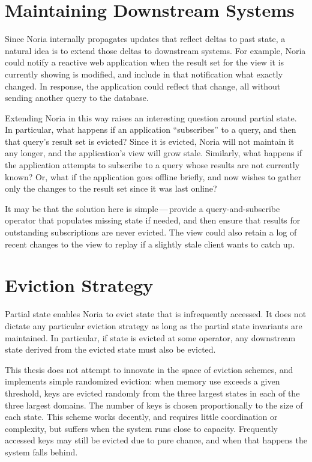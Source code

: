 \section{Maintaining Downstream Systems}

Since Noria internally propagates updates that reflect deltas to past state, a
natural idea is to extend those deltas to downstream systems. For example, Noria
could notify a reactive web application when the result set for the view it is
currently showing is modified, and include in that notification what exactly
changed. In response, the application could reflect that change, all without
sending another query to the database.

Extending Noria in this way raises an interesting question around partial state.
In particular, what happens if an application ``subscribes'' to a query, and
then that query's result set is evicted? Since it is evicted, Noria will not
maintain it any longer, and the application's view will grow stale. Similarly,
what happens if the application attempts to subscribe to a query whose results
are not currently known? Or, what if the application goes offline briefly, and
now wishes to gather only the changes to the result set since it was last
online?

It may be that the solution here is simple\,---\,provide a query-and-subscribe
operator that populates missing state if needed, and then ensure that results
for outstanding subscriptions are never evicted. The view could also retain a
log of recent changes to the view to replay if a slightly stale client wants to
catch up.

\section{Eviction Strategy}

Partial state enables Noria to evict state that is infrequently accessed. It
does not dictate any particular eviction strategy as long as the partial state
invariants are maintained. In particular, if state is evicted at some operator,
any downstream state derived from the evicted state must also be evicted.

This thesis does not attempt to innovate in the space of eviction schemes, and
implements simple randomized eviction: when memory use exceeds a given
threshold, keys are evicted randomly from the three largest states in each of
the three largest domains. The number of keys is chosen proportionally to the
size of each state. This scheme works decently, and requires little coordination
or complexity, but suffers when the system runs close to capacity. Frequently
accessed keys may still be evicted due to pure chance, and when that happens the
system falls behind.

